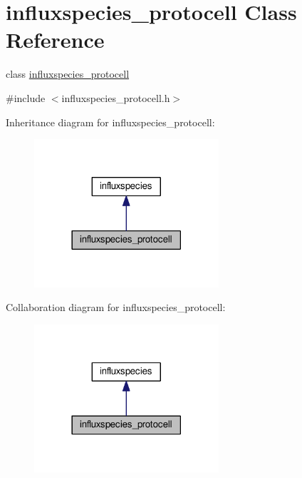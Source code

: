 \hypertarget{a00007}{\section{influxspecies\-\_\-protocell Class Reference}
\label{a00007}
}


class \hyperlink{a00007}{influxspecies\-\_\-protocell}  




{\ttfamily \#include $<$influxspecies\-\_\-protocell.\-h$>$}



Inheritance diagram for influxspecies\-\_\-protocell\-:\nopagebreak
\begin{figure}[H]
\begin{center}
\leavevmode
\includegraphics[width=194pt]{a00086}
\end{center}
\end{figure}


Collaboration diagram for influxspecies\-\_\-protocell\-:\nopagebreak
\begin{figure}[H]
\begin{center}
\leavevmode
\includegraphics[width=194pt]{a00087}
\end{center}
\end{figure}
